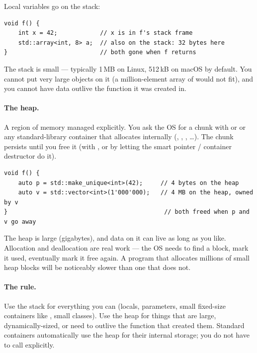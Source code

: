 Local variables go on the stack:

\begin{lstlisting}
void f() {
    int x = 42;            // x is in f's stack frame
    std::array<int, 8> a;  // also on the stack: 32 bytes here
}                          // both gone when f returns
\end{lstlisting}

The stack is small --- typically 1\,MB on Linux, 512\,kB on macOS
by default. You cannot put very large objects on it (a million-element
array of  would not fit), and you cannot have data outlive
the function it was created in.

\paragraph{The heap.}
A region of memory managed explicitly. You ask the OS for a chunk
with  or  or any
standard-library container that allocates internally
(, , , \dots).
The chunk persists until you free it (with , or by
letting the smart pointer / container destructor do it).

\begin{lstlisting}
void f() {
    auto p = std::make_unique<int>(42);     // 4 bytes on the heap
    auto v = std::vector<int>(1'000'000);   // 4 MB on the heap, owned by v
}                                            // both freed when p and v go away
\end{lstlisting}

The heap is large (gigabytes), and data on it can live as long as
you like. Allocation and deallocation are real work --- the OS needs
to find a block, mark it used, eventually mark it free again. A
program that allocates millions of small heap blocks will be
noticeably slower than one that does not.

\paragraph{The rule.}
Use the stack for everything you can (locals, parameters, small
fixed-size containers like , small classes). Use
the heap for things that are large, dynamically-sized, or need to
outlive the function that created them. Standard containers
automatically use the heap for their internal storage; you do not
have to call  explicitly.

